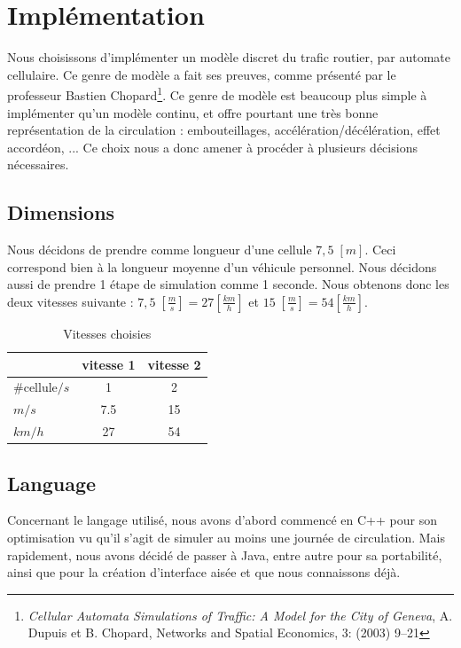 \documentclass[a4paper,11pt, titlepage]{extarticle}
\begin{document}
\newpage

\section{Implémentation}

Nous choisissons d'implémenter un modèle discret du trafic routier, par automate cellulaire. Ce genre de modèle a fait ses preuves, comme présenté par le professeur Bastien Chopard\footnote{\emph{Cellular Automata Simulations of Traffic:
A Model for the City of Geneva}, A. Dupuis et B. Chopard, Networks and Spatial Economics, 3: (2003) 9–21}. Ce genre de modèle est beaucoup plus simple à implémenter qu'un modèle continu, et offre pourtant une très bonne représentation de la circulation : embouteillages, accélération/décélération, effet accordéon, ... Ce choix nous a donc amener à procéder à plusieurs décisions nécessaires.

\subsection{Dimensions}

Nous décidons de prendre comme longueur d'une cellule $7,5 \; [m]$. Ceci correspond bien à la longueur moyenne d'un véhicule personnel. Nous décidons aussi de prendre 1 étape de simulation comme 1 seconde. Nous obtenons donc les deux vitesses suivante : $7,5 \; [\frac{m}{s}] = 27 [\frac{km}{h}]$ et $15 \; [\frac{m}{s}] = 54 [\frac{km}{h}]$.

\begin{table}[h!]
\begin{center}
\begin{tabular}{|l|c|c|}
\hline
 & vitesse 1 & vitesse 2 \\ \hline
\#cellule$/s$& 1 & 2 \\ \hline
$m/s$ & 7.5 & 15 \\ \hline\hline
$km/h$ & 27 & 54 \\ \hline
\end{tabular}
\end{center}
\caption{Vitesses choisies}
\label{tabSpeed}
\end{table}

\subsection{Language}

Concernant le langage utilisé, nous avons d'abord commencé en C++ pour son optimisation vu qu'il s'agit de simuler au moins une journée de circulation. Mais rapidement, nous avons décidé de passer à Java, entre autre pour sa portabilité, ainsi que pour la création d'interface aisée et que nous connaissons déjà.
\end{document}
